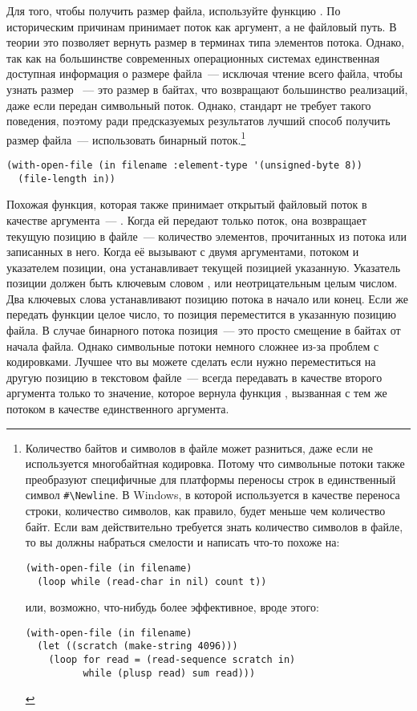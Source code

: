 Для того, чтобы получить размер файла, используйте функцию . По
историческим причинам  принимает поток как аргумент, а не файловый
путь. В теории это позволяет  вернуть размер в терминах типа элементов
потока. Однако, так как на большинстве современных операционных системах единственная
доступная информация о размере файла~--- исключая чтение всего файла, чтобы узнать размер
~--- это размер в байтах, что возвращают большинство реализаций, даже если
 передан символьный поток. Однако, стандарт не требует такого поведения,
поэтому ради предсказуемых результатов лучший способ получить размер файла~--- использовать
бинарный поток.\footnote{Количество байтов и символов в файле может разниться, даже если
  не используется многобайтная кодировка. Потому что символьные потоки также преобразуют
  специфичные для платформы переносы строк в единственный символ \lstinline!#\Newline!. В
  Windows, в которой используется  в качестве переноса строки, количество
  символов, как правило, будет меньше чем количество байт. Если вам действительно
  требуется знать количество символов в файле, то вы должны набраться смелости и написать
  что-то похоже на:

\begin{lstlisting}
(with-open-file (in filename) 
  (loop while (read-char in nil) count t))
\end{lstlisting}

или, возможно, что-нибудь более эффективное, вроде этого:

\begin{lstlisting}
(with-open-file (in filename) 
  (let ((scratch (make-string 4096))) 
    (loop for read = (read-sequence scratch in) 
          while (plusp read) sum read)))
\end{lstlisting}
}

\begin{lstlisting}
(with-open-file (in filename :element-type '(unsigned-byte 8)) 
  (file-length in)) 
\end{lstlisting}

Похожая функция, которая также принимает открытый файловый поток в качестве аргумента~---
. Когда ей передают только поток, она возвращает текущую позицию в
файле~--- количество элементов, прочитанных из потока или записанных в него. Когда её
вызывают с двумя аргументами, потоком и указателем позиции, она устанавливает текущей
позицией указанную. Указатель позиции должен быть ключевым словом ,
 или неотрицательным целым числом. Два ключевых слова устанавливают позицию
потока в начало или конец. Если же передать функции целое число, то позиция переместится в
указанную позицию файла. В случае бинарного потока позиция~--- это просто смещение в байтах
от начала файла. Однако символьные потоки немного сложнее из-за проблем с
кодировками. Лучшее что вы можете сделать если нужно переместиться на другую позицию в
текстовом файле~--- всегда передавать  в качестве второго аргумента
только то значение, которое вернула функция , вызванная с тем же
потоком в качестве единственного аргумента.

